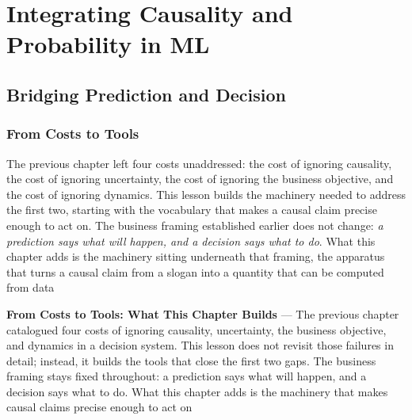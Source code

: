 
\chapter{Integrating Causality and Probability in ML}
\label{chap:integrating-causality-and-probability-in-ml}


\section{Bridging Prediction and Decision}
\label{sec:bridging-prediction-and-decision}

\subsection{From Costs to Tools}
\label{subsec:from-costs-to-tools}

The previous chapter left four costs unaddressed: the cost of ignoring causality,
the cost of ignoring uncertainty, the cost of ignoring the business objective, and
the cost of ignoring dynamics. This lesson builds the machinery needed to
address the first two, starting with the vocabulary that makes a causal claim precise
enough to act on. The business framing established earlier does not change: \textit{a
prediction says what will happen, and a decision says what to do}. What this chapter
adds is the machinery sitting underneath that framing, the apparatus that turns
a causal claim from a slogan into a quantity that can be computed from data

\textbf{From Costs to Tools: What This Chapter Builds} --- The previous chapter
catalogued four costs of ignoring causality, uncertainty, the business objective,
and dynamics in a decision system. This lesson does not revisit those failures
in detail; instead, it builds the tools that close the first two gaps. The business
framing stays fixed throughout: a prediction says what will happen, and a decision
says what to do. What this chapter adds is the machinery that makes causal
claims precise enough to act on

